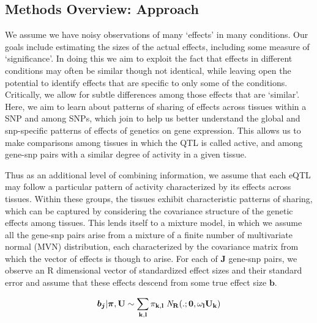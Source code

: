 \subsection{Methods Overview: Approach} 

We assume we have noisy observations of many `effects' in many  conditions. Our goals include estimating the sizes of the actual effects, including some measure of `significance'. In doing this we aim to exploit the fact that effects in different conditions may often be similar though not identical, while leaving open the potential to identify effects that are specific to only some of the conditions. Critically, we allow for subtle differences among those effects that are `similar'.  Here, we aim to learn about patterns of sharing of effects across tissues within a SNP and among SNPs, which join to help us better understand the global and snp-specific patterns of effects of genetics on gene expression. This allows us to make comparisons among tissues in which the QTL is called active, and among gene-snp pairs with a similar degree of activity in a given tissue. 

Thus as an additional level of combining information, we assume that each eQTL may follow a particular pattern of activity characterized by its effects across tissues. Within these groups, the tissues exhibit characteristic patterns of sharing, which can be captured by considering the covariance structure of the genetic effects among tissues. This lends itself to a mixture model, in which  we assume all the gene-snp pairs arise from a mixture of a finite number of multivariate normal (MVN) distribution, each characterized by the covariance matrix from which the vector of effects is though to arise. For each of $\textbf{J}$ gene-snp pairs, we observe an R dimensional vector of standardized effect sizes %
and their standard error and assume that these effects descend from some true effect size $\bm{b}$. 



 \begin{equation}
  \bm{b_{j}} | \bm{\pi},\bf{U} \sim \sum_{k,l} \pi_{k,l} \;{\it N}_R(.;\bm{0}, \omega_l U_{k})
  \label{eqn:mixprior}
\end{equation}

